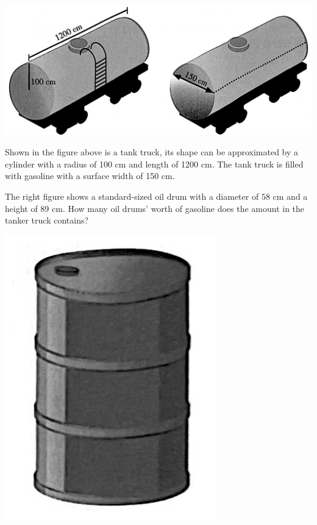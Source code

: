 \documentclass{report}
\begin{document}
\begin{question}
    \begin{center}
        \includegraphics[scale=0.18]{assets/8-24.png}
    \end{center}
    \noindent Shown in the figure above is a tank truck, its shape can be approximated by a cylinder with a radius of 100 cm and length of 1200 cm. The tank truck is filled with gasoline with a surface width of 150 cm.

    \begin{vwcol}[widths={0.8,0.2},rule=0pt,sep=1em]
        
        \vspace{1em}
        \noindent The right figure shows a standard-sized oil drum with a diameter of $58$ cm and a height of $89$ cm. How many oil drums' worth of gasoline does the amount in the tanker truck contains?

        \includegraphics[scale=0.18]{assets/8-25.png}
    \end{vwcol}


\end{question}
\end{document}
